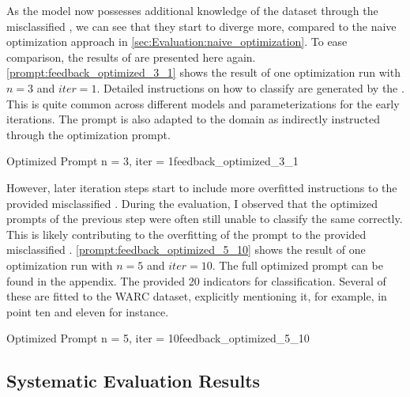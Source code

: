 As the model now possesses additional knowledge of the dataset through the misclassified \TLs, we can see that they start to diverge more, compared to the naive optimization approach in \autoref{sec:Evaluation:naive_optimization}.
To ease comparison, the results of \gpt are presented here again.
\autoref{prompt:feedback_optimized_3_1} shows the result of one optimization run with $n=3$ and $iter=1$.
Detailed instructions on how to classify \TLs are generated by the \LLM.
This is quite common across different models and parameterizations for the early iterations.
The prompt is also adapted to the \RtR domain as indirectly instructed through the optimization prompt.

\begin{prompt}{Optimized Prompt n = 3, iter = 1}{feedback_optimized_3_1}
    \\
    
\end{prompt}

However, later iteration steps start to include more overfitted instructions to the provided misclassified \TLs.
During the evaluation, I observed that the optimized prompts of the previous step were often still unable to classify the same \TLs correctly.
This is likely contributing to the overfitting of the prompt to the provided misclassified \TLs.
\autoref{prompt:feedback_optimized_5_10} shows the result of one optimization run with $n=5$ and $iter=10$.
The full optimized prompt can be found in the appendix. 
The \LLM provided 20 indicators for classification.
Several of these are fitted to the WARC dataset, explicitly mentioning it, for example, in point ten and eleven for instance.

\begin{prompt}{Optimized Prompt n = 5, iter = 10}{feedback_optimized_5_10}
    \\
    
\end{prompt}

\subsection{Systematic Evaluation Results}
\label{subsec:Evaluation:simple_feedback_optimization:systematic-evaluation-results}

